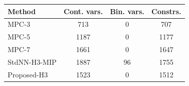 \begin{tabular}{lccc}
\toprule
Method & Cont. vars. & Bin. vars. & Constrs. \\
\midrule
MPC-3 & 713 & 0 & 707 \\
MPC-5 & 1187 & 0 & 1177 \\
MPC-7 & 1661 & 0 & 1647 \\
StdNN-H3-MIP & 1887 & 96 & 1755 \\
Proposed-H3 & 1523 & 0 & 1512 \\
\bottomrule
\end{tabular}
